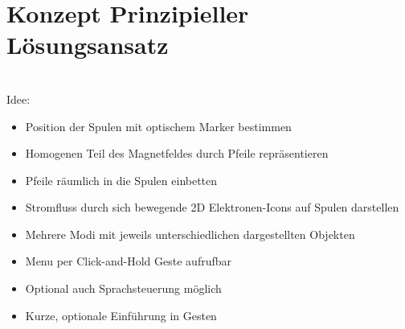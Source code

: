 \section{Konzept Prinzipieller Lösungsansatz}
\label{sec-4}
\\

Idee:
\begin{itemize}
	\item Position der Spulen mit optischem Marker bestimmen
	\item Homogenen Teil des Magnetfeldes durch Pfeile repräsentieren
	\item Pfeile räumlich in die Spulen einbetten
	\item Stromfluss durch sich bewegende 2D Elektronen-Icons auf Spulen darstellen
	\item Mehrere Modi mit jeweils unterschiedlichen dargestellten Objekten
	\item Menu per Click-and-Hold Geste aufrufbar
	\item Optional auch Sprachsteuerung möglich
	\item Kurze, optionale Einführung in Gesten
\end{itemize}

